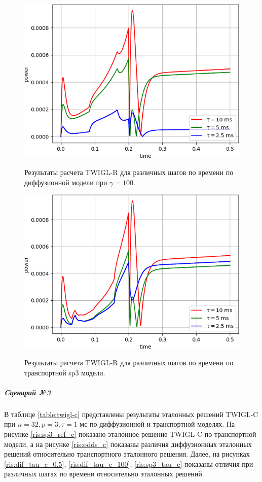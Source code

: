 \documentclass{crm-article}
\begin{document}
\begin{figure}[ht]
\begin{center}
	\includegraphics[width=0.5\linewidth]{dif_tau_r_100.png}\\
	\caption{\label{image:canonsummary}Результаты расчета TWIGL-R для различных шагов по времени по диффузионной модели при $\gamma=100$.}
	\label{ris:dif_tau_r_100}
\end{center}
\end{figure}

\begin{figure}[ht]
\begin{center}
	\includegraphics[width=0.5\linewidth]{sp3_tau_r.png}\\
	\caption{\label{image:canonsummary}Результаты расчета TWIGL-R для различных шагов по времени по транспортной sp3 модели.}
	\label{ris:sp3_tau_r}
\end{center}
\end{figure}

\pagebreak
\newpage

\subparagraph{Cценарий №3}
В таблице \ref{table:twigl-c} представлены результаты эталонных решений TWIGL-C при $n=32, p=3, \tau=1$ мс по диффузионной и транспортной моделях.
На рисунке \ref{ris:sp3_ref_c} показано эталонное решение TWIGL-C по транспортной модели, а на рисунке \ref{ris:odds_c} показаны различия диффузионных эталонных решений относительно транспортного эталонного решения. 
Далее, на рисунках \ref{ris:dif_tau_c_0.5}, \ref{ris:dif_tau_c_100}, \ref{ris:sp3_tau_c} показаны отличия при различных шагах по времени относительно эталонных решений.
\end{document}
